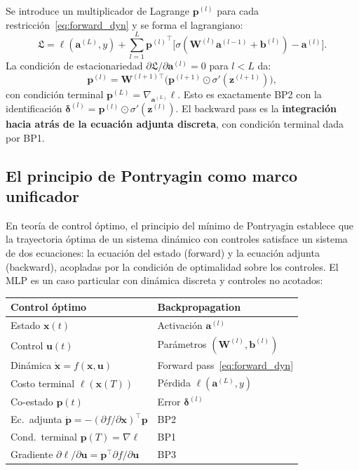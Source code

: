Se introduce un multiplicador de Lagrange $\bm{p}^{(l)}$ para cada
restricción~\eqref{eq:forward_dyn} y se forma el lagrangiano:
\begin{equation}
  \mathfrak{L} = \ell(\bm{a}^{(L)},y) + \sum_{l=1}^L
  {\bm{p}^{(l)}}^\top\bigl[\sigma(\bm{W}^{(l)}\bm{a}^{(l-1)}
  +\bm{b}^{(l)}) - \bm{a}^{(l)}\bigr].
  \label{eq:lagrangiano}
\end{equation}
La condición de estacionariedad
$\partial\mathfrak{L}/\partial\bm{a}^{(l)} = 0$ para $l < L$ da:
\begin{equation}
  \bm{p}^{(l)} = \bm{W}^{(l+1)\top}\bigl(\bm{p}^{(l+1)} \odot
  \sigma'(\bm{z}^{(l+1)})\bigr),
  \label{eq:adjunta_discreta}
\end{equation}
con condición terminal $\bm{p}^{(L)} = \nabla_{\bm{a}^{(L)}}\ell$. Esto
es exactamente BP2 con la identificación
$\bm{\delta}^{(l)} = \bm{p}^{(l)} \odot \sigma'(\bm{z}^{(l)})$. El
backward pass es la \textbf{integración hacia atrás de la ecuación adjunta
discreta}, con condición terminal dada por BP1.

\subsection{El principio de Pontryagin como marco unificador}
\label{subsec:pontryagin}

En teoría de control óptimo, el principio del mínimo de Pontryagin
establece que la trayectoria óptima de un sistema dinámico con controles
satisface un sistema de dos ecuaciones: la ecuación del estado (forward) y
la ecuación adjunta (backward), acopladas por la condición de optimalidad
sobre los controles. El MLP es un caso particular con dinámica discreta y
controles no acotados:

\begin{center}
\begin{tabular}{ll}
\toprule
\textbf{Control óptimo} & \textbf{Backpropagation} \\
\midrule
Estado $\bm{x}(t)$ & Activación $\bm{a}^{(l)}$ \\
Control $\bm{u}(t)$ & Parámetros $(\bm{W}^{(l)}, \bm{b}^{(l)})$ \\
Dinámica $\dot{\bm{x}} = f(\bm{x},\bm{u})$ & Forward pass~\eqref{eq:forward_dyn} \\
Costo terminal $\ell(\bm{x}(T))$ & Pérdida $\ell(\bm{a}^{(L)}, y)$ \\
Co-estado $\bm{p}(t)$ & Error $\bm{\delta}^{(l)}$ \\
Ec.\ adjunta $\dot{\bm{p}} = -(\partial f/\partial\bm{x})^\top\bm{p}$ & BP2 \\
Cond.\ terminal $\bm{p}(T) = \nabla\ell$ & BP1 \\
Gradiente $\partial\ell/\partial\bm{u} = \bm{p}^\top\partial f/\partial\bm{u}$ & BP3 \\
\bottomrule
\end{tabular}
\end{center}

